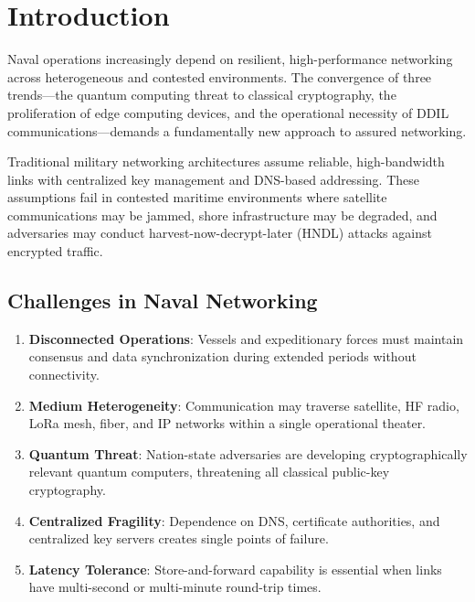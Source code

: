 \documentclass[11pt,letterpaper]{article}
\begin{document}
\section{Introduction}

Naval operations increasingly depend on resilient, high-performance networking across heterogeneous and contested environments. The convergence of three trends---the quantum computing threat to classical cryptography, the proliferation of edge computing devices, and the operational necessity of DDIL communications---demands a fundamentally new approach to assured networking.

Traditional military networking architectures assume reliable, high-bandwidth links with centralized key management and DNS-based addressing. These assumptions fail in contested maritime environments where satellite communications may be jammed, shore infrastructure may be degraded, and adversaries may conduct harvest-now-decrypt-later (HNDL) attacks against encrypted traffic.

\subsection{Challenges in Naval Networking}

\begin{enumerate}[label=(\roman*)]
\item \textbf{Disconnected Operations}: Vessels and expeditionary forces must maintain consensus and data synchronization during extended periods without connectivity.
\item \textbf{Medium Heterogeneity}: Communication may traverse satellite, HF radio, LoRa mesh, fiber, and IP networks within a single operational theater.
\item \textbf{Quantum Threat}: Nation-state adversaries are developing cryptographically relevant quantum computers, threatening all classical public-key cryptography.
\item \textbf{Centralized Fragility}: Dependence on DNS, certificate authorities, and centralized key servers creates single points of failure.
\item \textbf{Latency Tolerance}: Store-and-forward capability is essential when links have multi-second or multi-minute round-trip times.
\end{enumerate}
\end{document}
